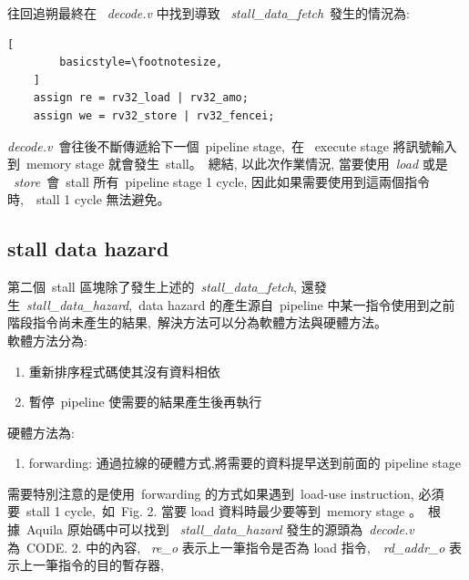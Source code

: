 \documentclass{article}
\begin{document}
\begin{CJK*}{UTF8}{bsmi}
\begin{multicols}{2}
\begin{flushleft}
往回追朔最終在 \ \textit{decode.v} 中找到導致 \ \textit{stall\_data\_fetch}\
發生的情況為:
\end{flushleft}

\begin{center}
    \begin{lstlisting}[
        basicstyle=\footnotesize, 
    ]
    assign re = rv32_load | rv32_amo; 
    assign we = rv32_store | rv32_fencei;
    \end{lstlisting}
\end{center}
\textit{decode.v}\ 會往後不斷傳遞給下一個\ pipeline stage,\
在 \ execute stage 將訊號輸入到\ memory stage 就會發生\ stall。\
總結, 以此次作業情況, 當要使用\ \textit{load} 或是 \ \textit{store}\ 
會\ stall 所有\ pipeline stage 1 cycle, 因此如果需要使用到這兩個指令時,\
\ stall 1 cycle 無法避免。

\begin{center}
    \subsection*{stall data hazard}
\end{center}

\begin{flushleft}
    第二個\ stall 區塊除了發生上述的\ \textit{stall\_data\_fetch},
    還發生\ \textit{stall\_data\_hazard},\ data hazard 的產生源自\ pipeline 中某一指令使用到之前階段指令尚未產生的結果,\
    解決方法可以分為軟體方法與硬體方法。\\
    軟體方法分為:\
    \begin{enumerate}
        \item 重新排序程式碼使其沒有資料相依
        \item 暫停\ pipeline 使需要的結果產生後再執行
    \end{enumerate}
    硬體方法為:
    \begin{enumerate}
        \item forwarding: 通過拉線的硬體方式,將需要的資料提早送到前面的 pipeline stage
    \end{enumerate}
    需要特別注意的是使用\ forwarding 的方式如果遇到\ load-use instruction, 必須要\ stall 1 cycle,\
    如\ Fig. 2. 當要 load 資料時最少要等到\ memory stage 。\
    根據\ Aquila 原始碼中可以找到 \ \textit{stall\_data\_hazard} 發生的源頭為\
    \textit{decode.v}\, 為\ CODE. 2. 中的內容, \ \textit{re\_o} 表示上一筆指令是否為 load 指令,\
    \ \textit{rd\_addr\_o} 表示上一筆指令的目的暫存器, \


\end{flushleft}
\end{multicols}
\end{CJK*}
\end{document}
